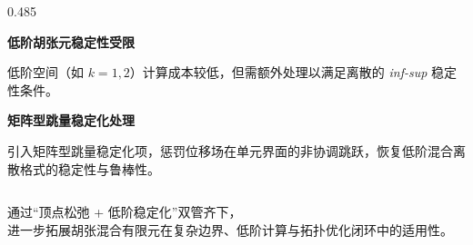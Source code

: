 \documentclass[notheorems]{beamer}
\begin{document}
\begin{frame}
\begin{columns}[T, totalwidth=\linewidth]
\begin{column}{0.485\linewidth}
\begin{tcolorbox}
{						\textbf{\enspace 低阶胡张元稳定性受限}\par
						\vspace{2pt}
						低阶空间（如 $k=1,2$）计算成本较低，但需额外处理以满足离散的 \textit{inf-sup} 稳定性条件。
						
						\vspace{4pt}
						\textbf{\enspace 矩阵型跳量稳定化处理}\par
						\vspace{2pt}
						引入矩阵型跳量稳定化项，惩罚位移场在单元界面的非协调跳跃，恢复低阶混合离散格式的稳定性与鲁棒性。
					}
				\end{tcolorbox}
			\end{column}
			
		\end{columns}
		
		\begin{tcolorbox}[
			colback=structure.fg, colframe=structure.fg,
			arc=3pt, boxrule=0pt,
			top=4pt, bottom=4pt, left=8pt, right=8pt]
			\centering
			{\fontsize{8.5}{12}\selectfont\sffamily\color{white}
				通过“顶点松弛 + 低阶稳定化”双管齐下，\\
				进一步拓展胡张混合有限元在复杂边界、低阶计算与拓扑优化闭环中的适用性。}
		\end{tcolorbox}
		
	\end{frame}
	
	
\end{document}
